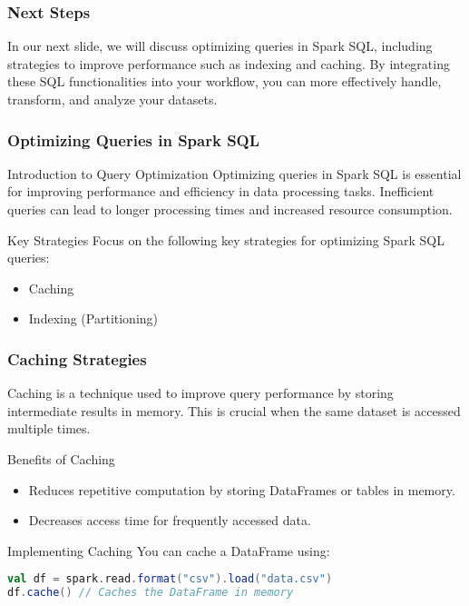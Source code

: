 \documentclass[aspectratio=169]{beamer}
\begin{document}
\begin{frame}
    \frametitle{Next Steps}
    In our next slide, we will discuss optimizing queries in Spark SQL, including strategies to improve performance such as indexing and caching. By integrating these SQL functionalities into your workflow, you can more effectively handle, transform, and analyze your datasets.
\end{frame}

\begin{frame}
  \frametitle{Optimizing Queries in Spark SQL}
  \begin{block}{Introduction to Query Optimization}
    Optimizing queries in Spark SQL is essential for improving performance and efficiency in data processing tasks. Inefficient queries can lead to longer processing times and increased resource consumption.
  \end{block}
  \begin{block}{Key Strategies}
    Focus on the following key strategies for optimizing Spark SQL queries:
    \begin{itemize}
      \item Caching
      \item Indexing (Partitioning)
    \end{itemize}
  \end{block}
\end{frame}

\begin{frame}[fragile]
  \frametitle{Caching Strategies}
  Caching is a technique used to improve query performance by storing intermediate results in memory. This is crucial when the same dataset is accessed multiple times.
  
  \begin{block}{Benefits of Caching}
    \begin{itemize}
      \item Reduces repetitive computation by storing DataFrames or tables in memory.
      \item Decreases access time for frequently accessed data.
    \end{itemize}
  \end{block}
  
  \begin{block}{Implementing Caching}
    You can cache a DataFrame using:
    \begin{lstlisting}[language=Scala]
val df = spark.read.format("csv").load("data.csv")
df.cache() // Caches the DataFrame in memory
    \end{lstlisting}
  \end{block}
\end{frame}
\end{document}
